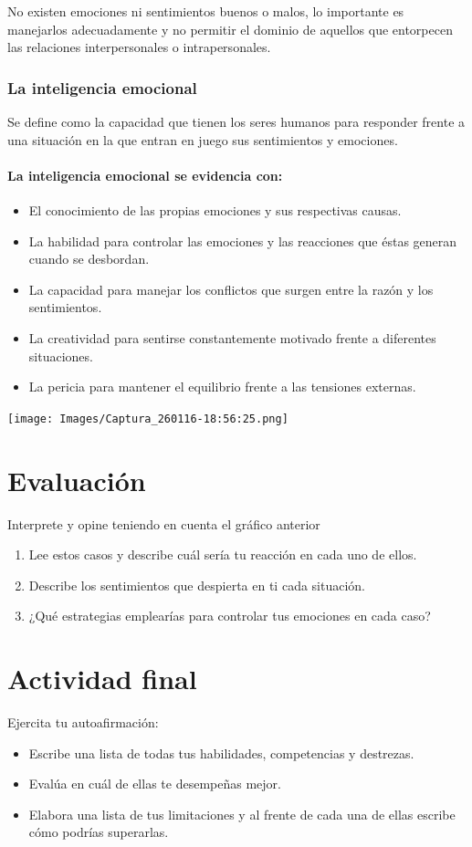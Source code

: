 \documentclass[twoside]{article}
\begin{document}
No existen emociones ni sentimientos buenos o malos,
lo importante es manejarlos adecuadamente y no permitir el dominio de aquellos que entorpecen las relaciones interpersonales o intrapersonales.
\subsubsection*{La inteligencia emocional}
Se define como la capacidad que tienen los seres humanos
para responder frente a una situación en la que entran en
juego sus sentimientos y emociones.
\paragraph*{La inteligencia emocional se evidencia con:}
\begin{itemize}
\item El conocimiento de las propias emociones y sus
respectivas causas.
\item La habilidad para controlar las emociones y las
reacciones que éstas generan cuando se desbordan.
\item La capacidad para manejar los conflictos que surgen
entre la razón y los sentimientos.
\item La creatividad para sentirse constantemente motivado frente a diferentes situaciones.
\item La pericia para mantener el equilibrio frente a las
tensiones externas.
\end{itemize}
\texttt{[image: Images/Captura\_260116-18:56:25.png]} 
\section*{Evaluación}
Interprete y opine teniendo en cuenta el gráfico anterior
\begin{enumerate}
\item Lee estos casos y describe cuál sería tu reacción en cada uno de ellos.
\item Describe los sentimientos que despierta en ti cada situación.
\item ¿Qué estrategias emplearías para controlar tus emociones en cada caso?
\end{enumerate}
\section*{Actividad final}
Ejercita tu autoafirmación:
\begin{itemize}
\item Escribe una lista de todas tus habilidades, competencias y destrezas.
\item Evalúa en cuál de ellas te desempeñas mejor.
\item Elabora una lista de tus limitaciones y al frente de cada una de ellas escribe cómo podrías superarlas.
\end{itemize}
\end{document}
